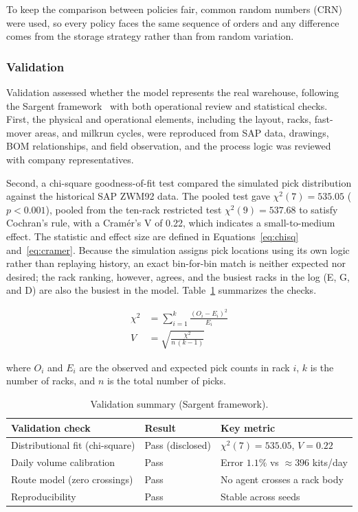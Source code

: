 \documentclass[12pt,a4paper]{article}
\begin{document}
To keep the comparison between policies fair, common random numbers (CRN) were
used, so every policy faces the same sequence of orders and any difference
comes from the storage strategy rather than from random variation.

\subsubsection{Validation}
Validation assessed whether the model represents the real warehouse, following
the Sargent framework~\cite{sargent2013} with both operational review and
statistical checks. First, the physical and operational elements, including
the layout, racks, fast-mover areas, and milkrun cycles, were reproduced from
SAP data, drawings, BOM relationships, and field observation, and the process
logic was reviewed with company representatives.

Second, a chi-square goodness-of-fit test compared the simulated pick
distribution against the historical SAP ZWM92 data. The pooled test gave
$\chi^2(7)=535.05$ ($p<0.001$), pooled from the ten-rack restricted test
$\chi^2(9)=537.68$ to satisfy Cochran's rule, with a Cramér's V of 0.22,
which indicates a small-to-medium effect. The statistic and effect size are
defined in Equations~\eqref{eq:chisq} and~\eqref{eq:cramer}. Because the
simulation assigns pick locations using its own logic rather than replaying
history, an exact bin-for-bin match is neither expected nor desired; the rack
ranking, however, agrees, and the busiest racks in the log (E, G, and D) are
also the busiest in the model. Table~\ref{tab:validate} summarizes the checks.

\begin{align}
\chi^2 &= \sum_{i=1}^{k}\frac{(O_i-E_i)^2}{E_i} \label{eq:chisq}\\[2pt]
V &= \sqrt{\frac{\chi^2}{n\,(k-1)}} \label{eq:cramer}
\end{align}

\noindent where $O_i$ and $E_i$ are the observed and expected pick counts in
rack $i$, $k$ is the number of racks, and $n$ is the total number of picks.

\begin{table}[htbp]
\centering
\caption{Validation summary (Sargent framework).}
\label{tab:validate}
\begin{tabular}{lll}
\toprule
Validation check & Result & Key metric \\
\midrule
Distributional fit (chi-square) & Pass (disclosed) & $\chi^2(7)=535.05$, $V=0.22$ \\
Daily volume calibration & Pass & Error $1.1\%$ vs $\approx396$ kits/day \\
Route model (zero crossings) & Pass & No agent crosses a rack body \\
Reproducibility & Pass & Stable across seeds \\
\bottomrule
\end{tabular}
\end{table}
\end{document}
